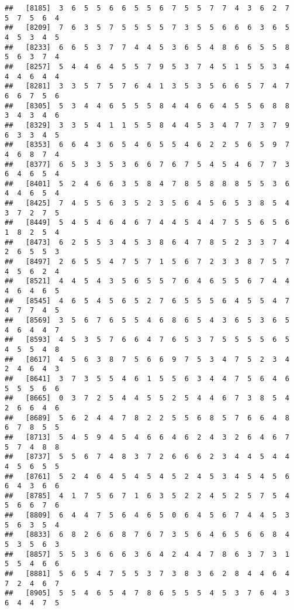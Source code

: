 \documentclass[
]{book}
\begin{document}
\begin{verbatim}
##   [8185]  3  6  5  5  6  6  5  5  6  7  5  5  7  7  4  3  6  2  7  5  7  5  6  4
##   [8209]  7  6  3  5  7  5  5  5  5  7  3  5  5  6  6  6  3  6  5  4  5  3  4  5
##   [8233]  6  6  5  3  7  7  4  4  5  3  6  5  4  8  6  6  5  5  8  5  6  3  7  4
##   [8257]  5  4  4  6  4  5  5  7  9  5  3  7  4  5  1  5  5  3  4  4  4  6  4  4
##   [8281]  3  3  5  7  5  7  6  4  1  3  5  3  5  6  6  5  7  4  7  6  6  7  5  6
##   [8305]  5  3  4  4  6  5  5  5  8  4  4  6  6  4  5  5  6  8  8  3  4  3  4  6
##   [8329]  3  3  5  4  1  1  5  5  8  4  4  5  3  4  7  7  3  7  9  6  3  3  4  5
##   [8353]  6  6  4  3  6  5  4  6  5  5  4  6  2  2  5  6  5  9  7  4  6  8  7  4
##   [8377]  6  5  3  3  5  3  6  6  7  6  7  5  4  5  4  6  7  7  3  6  4  6  5  4
##   [8401]  5  2  4  6  6  3  5  8  4  7  8  5  8  8  8  5  5  3  6  4  4  6  5  4
##   [8425]  7  4  5  5  6  3  5  2  3  5  6  4  5  6  5  3  8  5  4  3  7  2  7  5
##   [8449]  5  4  5  4  6  4  6  7  4  4  5  4  4  7  5  5  6  5  6  1  8  2  5  4
##   [8473]  6  2  5  5  3  4  5  3  8  6  4  7  8  5  2  3  3  7  4  2  6  5  5  3
##   [8497]  2  6  5  5  4  7  5  7  1  5  6  7  2  3  3  8  7  5  7  4  5  6  2  4
##   [8521]  4  4  5  4  3  5  6  5  5  7  6  4  6  5  5  6  7  4  4  4  6  4  6  5
##   [8545]  4  6  5  4  5  6  5  2  7  6  5  5  5  6  4  5  5  4  7  4  7  7  4  5
##   [8569]  3  5  6  7  6  5  5  4  6  8  6  5  4  3  6  5  3  6  5  4  6  4  4  7
##   [8593]  4  5  3  5  7  6  6  4  7  6  5  3  7  5  5  5  5  6  5  4  5  5  4  8
##   [8617]  4  5  6  3  8  7  5  6  6  9  7  5  3  4  7  5  2  3  4  2  4  6  4  3
##   [8641]  3  7  3  5  5  4  6  1  5  5  6  3  4  4  7  5  6  4  6  5  5  5  6  6
##   [8665]  0  3  7  2  5  4  4  5  5  2  5  4  4  6  7  3  8  5  4  2  6  6  4  6
##   [8689]  5  6  2  4  4  7  8  2  2  5  5  6  8  5  7  6  6  4  8  6  7  8  5  5
##   [8713]  5  4  5  9  4  5  4  6  6  4  6  2  4  3  2  6  4  6  7  5  7  4  8  8
##   [8737]  5  5  6  7  4  8  3  7  2  6  6  6  2  3  4  4  5  4  4  4  5  6  5  5
##   [8761]  5  2  4  6  4  5  4  5  4  5  2  4  5  3  4  5  4  5  6  6  4  3  6  6
##   [8785]  4  1  7  5  6  7  1  6  3  5  2  2  4  5  2  5  7  5  4  5  6  6  7  6
##   [8809]  6  4  4  7  5  6  4  6  5  0  6  4  5  6  7  4  4  5  3  5  6  3  5  4
##   [8833]  6  8  2  6  6  8  7  6  7  3  5  6  4  6  5  6  6  8  4  5  3  5  6  3
##   [8857]  5  5  3  6  6  6  3  6  4  2  4  4  7  8  6  3  7  3  1  5  5  4  6  6
##   [8881]  5  6  5  4  7  5  5  3  7  3  8  3  6  2  8  4  4  6  4  7  2  4  6  7
##   [8905]  5  5  4  6  5  4  7  8  6  5  5  5  4  5  3  7  6  4  3  6  4  4  7  5

\end{verbatim}
\end{document}
